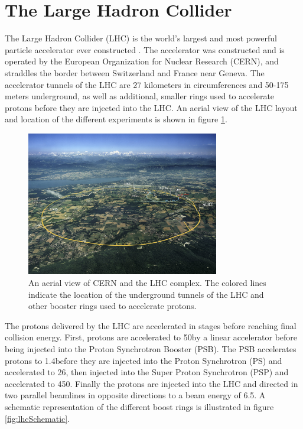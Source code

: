 \section{The Large Hadron Collider}
\label{sec:lhc}

The Large Hadron Collider (LHC) is the world's largest and most powerful particle accelerator ever constructed \cite{Evans:2008zzb}. The accelerator was constructed and is operated by the European Organization for Nuclear Research (CERN), and straddles the border between Switzerland and France near Geneva. The accelerator tunnels of the LHC are 27 kilometers in circumferences and 50-175 meters underground, as well as additional, smaller rings used to accelerate protons before they are injected into the LHC. An aerial view of the LHC layout and location of the different experiments is shown in figure \ref{fig:lhcAerial}.

\begin{figure}
	\centering
	\includegraphics[width=0.75\textwidth]{detector/figs/2048px-CERN_Aerial_View.jpg}
	\caption{An aerial view of CERN and the LHC complex. The colored lines indicate the location of the underground tunnels of the LHC and other booster rings used to accelerate protons. \cite{cc}}
	\label{fig:lhcAerial}
\end{figure}

The protons delivered by the LHC are accelerated in stages before reaching final collision energy. First, protons are accelerated to 50\MeV by a linear accelerator before being injected into the Proton Synchrotron Booster (PSB). The PSB accelerates protons to 1.4\GeV before they are injected into the Proton Synchrotron (PS) and accelerated to 26\GeV, then injected into the Super Proton Synchrotron (PSP) and accelerated to 450\GeV. Finally the protons are injected into the LHC and directed in two parallel beamlines in opposite directions to a beam energy of 6.5\TeV. A schematic representation of the different boost rings is illustrated in figure \ref{fig:lhcSchematic}. 

